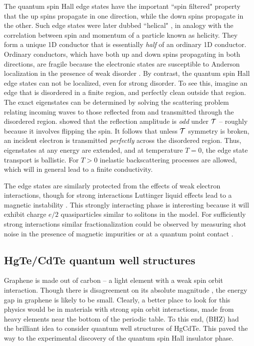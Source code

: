 \documentclass[twocolumn,floatfix,showpacs,rmp,aps]{revtex4}
\begin{document}
The quantum spin Hall edge states have the
important ``spin filtered" property that the up spins propagate in one direction,
while the down spins propagate in the other.  Such edge states were later dubbed
``helical" \cite{wu06}, in analogy with the correlation between spin and momentum
of a particle known as helicity.
They form a unique 1D conductor that is essentially {\it half} of an ordinary 1D conductor.
Ordinary conductors, which have both up and down spins propagating in
both directions, are fragile because the electronic states are
susceptible to Anderson localization in the presence of weak
disorder \cite{anderson58,lee85}.  By contrast, the quantum spin Hall edge states can not be localized,
even for strong disorder.  To see this, imagine an edge that is
disordered in a finite region, and perfectly clean outside that
region.  The exact eigenstates can be determined by solving the
scattering problem relating incoming waves to those reflected from
and transmitted through the disordered region.  \textcite{kanemele05a}
showed that the reflection amplitude is {\it odd} under ${\cal T}$
-- roughly because it involves flipping the spin.  It
follows that unless ${\cal T}$ symmetry is broken, an incident
electron is transmitted {\it perfectly} across the disordered region.
Thus, eigenstates at any energy are extended, and
at temperature $T=0$, the edge state transport is
ballistic.  For $T>0$ inelastic backscattering processes are
allowed, which will in general lead to a finite conductivity.

The edge states are similarly protected from the
effects of weak electron interactions, though for strong interactions Luttinger liquid
effects lead to a magnetic instability \cite{wu06,xu06}.   This
strongly interacting phase is interesting because it will
exhibit charge $e/2$ quasiparticles similar to
solitons in the \textcite{su79} model.  For sufficiently strong interactions
similar fractionalization could
be observed by measuring shot noise in the presence of magnetic
impurities \cite{maciejko09} or at a quantum point contact \cite{teokane09}.

\subsection{HgTe/CdTe quantum well structures}
\label{sec:hgcdte}

Graphene is made out of carbon -- a
light element with a weak spin orbit interaction.  Though there
is disagreement on its absolute magnitude \cite{min06,huertas06,yao07,boettger07,gmitra09},
the energy gap in graphene is likely to be small.
Clearly, a better place to look for this physics would be in
materials with strong spin orbit interactions, made from
heavy elements near the bottom of the periodic table.
To this end, \textcite{bernevighugheszhang06} (BHZ) had the brilliant idea to
consider quantum well structures of HgCdTe.  This paved
the way to the experimental discovery of the quantum spin Hall
insulator phase.
\end{document}

